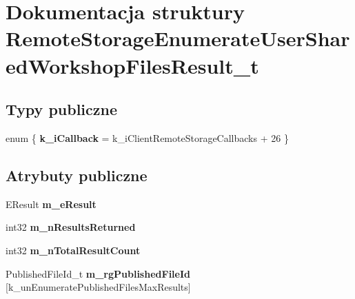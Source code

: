 \hypertarget{struct_remote_storage_enumerate_user_shared_workshop_files_result__t}{}\section{Dokumentacja struktury Remote\+Storage\+Enumerate\+User\+Shared\+Workshop\+Files\+Result\+\_\+t}
\label{struct_remote_storage_enumerate_user_shared_workshop_files_result__t}
\subsection*{Typy publiczne}
\begin{DoxyCompactItemize}
\item 
\mbox{\label{struct_remote_storage_enumerate_user_shared_workshop_files_result__t_af3ea9e0a9fe040c483f1523edf65989e}} 
enum \{ {\bfseries k\+\_\+i\+Callback} = k\+\_\+i\+Client\+Remote\+Storage\+Callbacks + 26
 \}
\end{DoxyCompactItemize}
\subsection*{Atrybuty publiczne}
\begin{DoxyCompactItemize}
\item 
\mbox{\label{struct_remote_storage_enumerate_user_shared_workshop_files_result__t_a61cbb5eb5e4d011b53fd20bb6bafd60a}} 
E\+Result {\bfseries m\+\_\+e\+Result}
\item 
\mbox{\label{struct_remote_storage_enumerate_user_shared_workshop_files_result__t_a8d2e79f84e4b9ebc3dfb45f6cf58d487}} 
int32 {\bfseries m\+\_\+n\+Results\+Returned}
\item 
\mbox{\label{struct_remote_storage_enumerate_user_shared_workshop_files_result__t_a997ccd0c38d02a652834cb165baa0a1e}} 
int32 {\bfseries m\+\_\+n\+Total\+Result\+Count}
\item 
\mbox{\label{struct_remote_storage_enumerate_user_shared_workshop_files_result__t_ada4b529f90e609a326dab331b0afa2b4}} 
Published\+File\+Id\+\_\+t {\bfseries m\+\_\+rg\+Published\+File\+Id} \mbox{[}k\+\_\+un\+Enumerate\+Published\+Files\+Max\+Results\mbox{]}
\end{DoxyCompactItemize}


